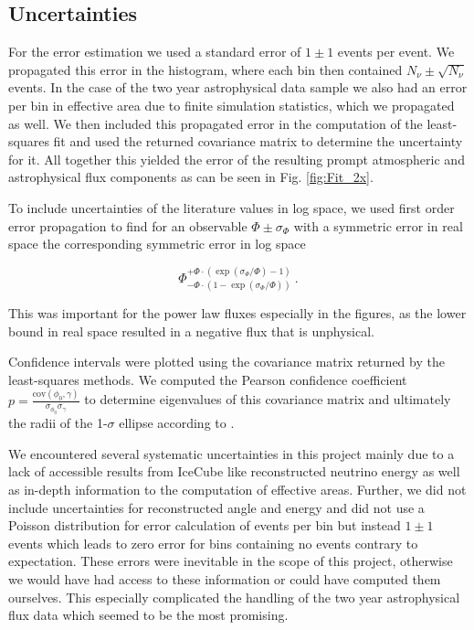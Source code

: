 \documentclass[%
 reprint,
 preprintnumbers,
 nofootinbib,
 amsmath,amssymb,
 aps,
]{revtex4-2}
\begin{document}
\subsection{Uncertainties}

For the error estimation we used a standard error of $1\pm 1$ events per event. We propagated this error in the histogram, where each bin then contained $N_\nu \pm \sqrt{N_\nu}$ events. In the case of the two year astrophysical data sample we also had an error per bin in effective area due to finite simulation statistics, which we propagated as well. We then included this propagated error in the computation of the least-squares fit and used the returned covariance matrix to determine the uncertainty for it. All together this yielded the error of the resulting prompt atmospheric and astrophysical flux components as can be seen in Fig. \ref{fig:Fit_2x}.

To include uncertainties of the literature values in log space, we used first order error propagation to find for an observable $\Phi\pm\sigma_\Phi$ with a symmetric error in real space the corresponding symmetric error in log space

\begin{equation}
    \Phi^{+\Phi\cdot(\exp{(\sigma_\Phi / \Phi)}-1)}_{-\Phi\cdot(1-\exp{(\sigma_\Phi / \Phi)})} \ .
\end{equation}

This was important for the power law fluxes especially in the figures, as the lower bound in real space resulted in a negative flux that is unphysical.

Confidence intervals were plotted using the covariance matrix returned by the least-squares methods. We computed the Pearson confidence coefficient $p = \frac{\text{cov}(\phi_0,\gamma)}{\sigma_{\phi_0}\sigma_\gamma}$ to determine eigenvalues of this covariance matrix and ultimately the radii of the 1-$\sigma$ ellipse according to \cite{cov}.

We encountered several systematic uncertainties in this project mainly due to a lack of accessible results from IceCube like reconstructed neutrino energy as well as in-depth information to the computation of effective areas. Further, we did not include uncertainties for reconstructed angle and energy and did not use a Poisson distribution for error calculation of events per bin but instead $1\pm 1$ events which leads to zero error for bins containing no events contrary to expectation. These errors were inevitable in the scope of this project, otherwise we would have had access to these information or could have computed them ourselves. This especially complicated the handling of the two year astrophysical flux data which seemed to be the most promising.
\end{document}
